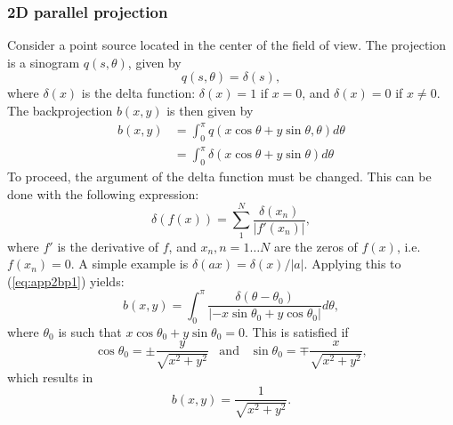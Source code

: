 \documentclass[11pt,oneside]{article}
\begin{document}
\subsubsection{2D parallel projection}
Consider a point source located in the center of the field of view.
The projection is a sinogram $q(s, \theta)$, given by
\begin{equation}
  q(s, \theta) = \delta(s),
\end{equation}
where $\delta(x)$ is the delta function: $\delta(x) = 1$ if $x = 0$, and
$\delta(x) = 0$ if $x \neq 0$.
The backprojection $b(x,y)$ is then given by
\begin{align}
  b(x,y) &= \int_0^\pi q(x \cos\theta + y\sin\theta, \theta)
                d\theta \nonumber\\
         &= \int_0^\pi \delta(x\cos\theta + y\sin\theta) d\theta
                \label{eq:app2bp1}
\end{align}
To proceed, the argument of the delta function must be changed. This
can be done with the following expression:
\begin{equation}
  \delta(f(x)) = \sum_1^N \frac{\delta(x_n)}{|f'(x_n)|},
\end{equation}
where $f'$ is the derivative of $f$, and $x_n, n=1 \ldots N$ are the
zeros of $f(x)$, i.e. $f(x_n) = 0$. A simple example is $\delta(ax) =
\delta(x) / |a|$. Applying this to (\ref{eq:app2bp1}) yields:
\begin{equation}
 b(x,y)  =  \int_0^\pi \frac{\delta(\theta - \theta_0)}
                              {|-x\sin\theta_0 + y\cos\theta_0|} d\theta,
\end{equation}
where $\theta_0$ is such that $x\cos\theta_0 + y\sin\theta_0 =
0$. This is satisfied if
\begin{displaymath}
  \cos\theta_0 = \pm \frac{y}{\sqrt{x^2+y^2}} 
       \;\;\;\mbox{and}\;\;\;
  \sin\theta_0 = \mp \frac{x}{\sqrt{x^2+y^2}},
\end{displaymath}
which results in
\begin{equation}
  b(x,y) = \frac{1}{\sqrt{x^2 + y^2}}.
\end{equation}
\end{document}
